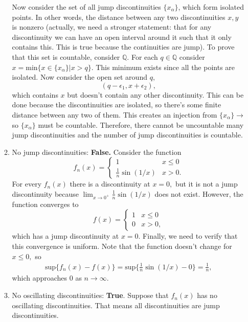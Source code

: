\documentclass{article}
\numberwithin{equation}{section}
\begin{document}
\begin{enumerate}
\begin{enumerate}[label=(\alph*)]
        Now consider the set of all jump discontinuities $\{x_\alpha\}$, which form isolated points. In other words, the distance between any two discontinuities $x,y$ is nonzero (actually, we need a stronger statement: that for any discontinuity we can have an open interval around it such that it only contains this. This is true because the continuities are jump). To prove that this set is countable, consider $\mathbb{Q}.$ For each $q\in \mathbb{Q}$ consider $x = \text{min}\{x\in \{x_\alpha\}| x>q\}.$ This minimum exists since all the points are isolated. Now consider the open set around $q,$
        \begin{equation}
            (q-\epsilon_1, x + \epsilon_2),
        \end{equation}
        which contains $x$ but doesn't contain any other discontinuity. This can be done because the discontinuities are isolated, so there's some finite distance between any two of them. This creates an injection from $\{x_\alpha\} \to $ so $\{x_\alpha\}$ must be countable. Therefore, there cannot be uncountable many jump discontinuities and the number of jump discontinuities is countable.
        \item No jump discontinuities: \textbf{False.} Consider the function 
        \begin{equation}
            f_n(x) = \begin{cases}
                1 & x \le 0 \\ 
                \frac{1}{n}\sin(1/x) & x > 0.
            \end{cases}
        \end{equation}
        For every $f_n(x)$ there is a discontinuity at $x=0,$ but it is not a jump discontinuity because $\lim_{x\to 0^+} \frac{1}{n}\sin(1/x)$ does not exist. However, the function converges to 
        \begin{equation}
            f(x) = \begin{cases}
                1 & x \le 0 \\ 
                0 & x > 0,
            \end{cases}
        \end{equation}
        which has a jump discontinuity at $x=0.$ Finally, we need to verify that this convergence is uniform. Note that the function doesn't change for $x\le 0 ,$ so 
        \begin{align}
            \text{sup}\{f_n(x)-f(x)\} = \text{sup}\{\frac{1}{n}\sin(1/x) - 0\} = \frac{1}{n},
        \end{align}
        which approaches $0$ as $n\to \infty.$
        \item No oscillating discontinuities: \textbf{True}. Suppose that $f_n(x)$ has no oscillating discontinuities. That means all discontinuities are jump discontinuities.
        

\end{enumerate}
\end{enumerate}
\end{document}
